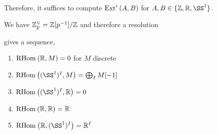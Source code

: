 \documentclass[12pt]{article}
\begin{document}
Therefore, it suffices to compute $\mathrm{Ext}^{i}_{} \left( A, B \right)$ for $A, B \in \{ \Z, \RR, \SS^1 \}$.

\begin{example}
We have $\mathbb{Z}_p^\vee = \mathbb{Z}[p^{-1}]/\mathbb{Z}$ and therefore a resolution
\begin{center}
\end{center}
gives a sequence,
\begin{center}
\end{center}
\end{example}

\begin{theorem}
\begin{enumerate}
\item $\mathrm{RHom}_{} \left( \mathbb{R}, M \right) = 0$ for $M$ discrete

\item $\RHom{}{(\SS^1)^I}{M} = \bigoplus_I M[-1]$

\item $\RHom{}{(\SS^1)^I}{\RR} = 0$

\item $\mathrm{RHom}_{} \left( \mathbb{R}, \mathbb{R} \right) = \mathbb{R}$

\item $\RHom{}{\RR}{(\SS^1)^I} = \RR^I$
\end{enumerate}
\end{theorem}
\end{document}
